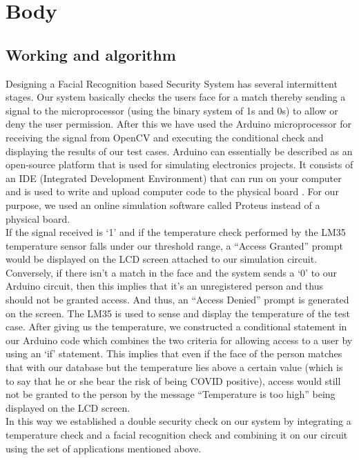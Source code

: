 \documentclass[conference]{IEEEtran}
\begin{document}
	\section{Body}
	\subsection{Working and algorithm}
	Designing a Facial Recognition based Security System has
	several intermittent stages. Our system basically checks the users face for a match thereby sending a signal to the microprocessor (using the binary system of 1s and 0s) to allow or deny the user permission.
	After this we have used the Arduino microprocessor for
	receiving the signal from OpenCV \cite{e} and executing the
	conditional check and displaying the results of our test cases. Arduino can essentially be described as an open-source platform that is used for simulating electronics projects. It consists of an IDE (Integrated Development Environment) that can run on your computer and is used to write and upload computer code to the physical board \cite{h}. For our purpose, we used an online simulation software called Proteus instead of
	a physical board.
	\\If the signal received is ‘1’ and if the temperature check performed by the LM35 temperature sensor falls under our threshold range, a “Access Granted” prompt would be displayed on the LCD screen attached to our simulation circuit.
	\\Conversely, if there isn't a match in the face and the system sends a ‘0’ to our Arduino circuit, then this implies that it's an unregistered person and thus should not be granted access. And thus, an “Access Denied” prompt is generated on the screen. The LM35 is used to sense and display the temperature \cite{c} of the test case. After giving us the temperature, we constructed a conditional statement in our Arduino code which combines the two criteria for allowing access to a user by using an ‘if’ statement. This implies that even if the face of the person matches that with our database but the temperature lies above a certain value (which is to say that he or she bear the risk of being COVID positive), access would still not be granted to the person by the message “Temperature is too high” being
	displayed on the LCD screen.
	\\In this way we established a double security check on our system by integrating a temperature check and a facial recognition check and combining it on our circuit using the set of applications mentioned above.
\end{document}

